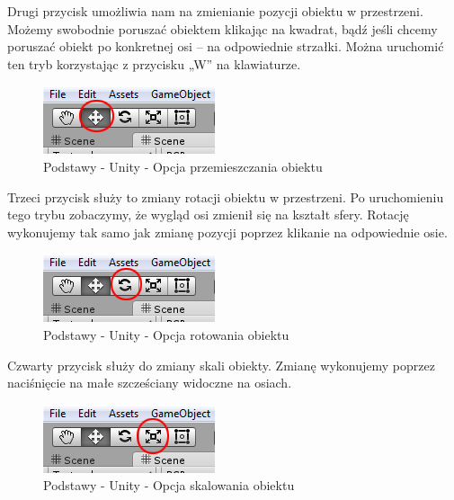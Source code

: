 \documentclass[12pt]{xmgr}
\begin{document}
Drugi przycisk umożliwia nam na zmienianie pozycji obiektu w przestrzeni. Możemy swobodnie poruszać obiektem klikając na kwadrat, bądź jeśli chcemy poruszać obiekt po konkretnej osi – na odpowiednie strzałki. Można uruchomić ten tryb korzystając z przycisku „W” na klawiaturze.

\begin{figure}[!htb]
    \begin{center}
    \includegraphics[scale=0.4]{Screeny/rodzial5screeny/move_option}
    \end{center}
    \caption{Podstawy - Unity - Opcja przemieszczania obiektu}
\end{figure}

Trzeci przycisk służy to zmiany rotacji obiektu w przestrzeni. Po uruchomieniu tego trybu zobaczymy, że wygląd osi zmienił się na kształt sfery. Rotację wykonujemy tak samo jak zmianę pozycji poprzez klikanie na odpowiednie osie.

\begin{figure}[!htb]
    \begin{center}
    \includegraphics[scale=0.4]{Screeny/rodzial5screeny/rotate_option}
    \end{center}
    \caption{Podstawy - Unity - Opcja rotowania obiektu}
\end{figure}

Czwarty przycisk służy do zmiany skali obiekty. Zmianę wykonujemy poprzez naciśnięcie na małe szcześciany widoczne na osiach.

\begin{figure}[!htb]
    \begin{center}
    \includegraphics[scale=0.4]{Screeny/rodzial5screeny/scale_option}
    \end{center}
    \caption{Podstawy - Unity - Opcja skalowania obiektu}
\end{figure}
\end{document}
